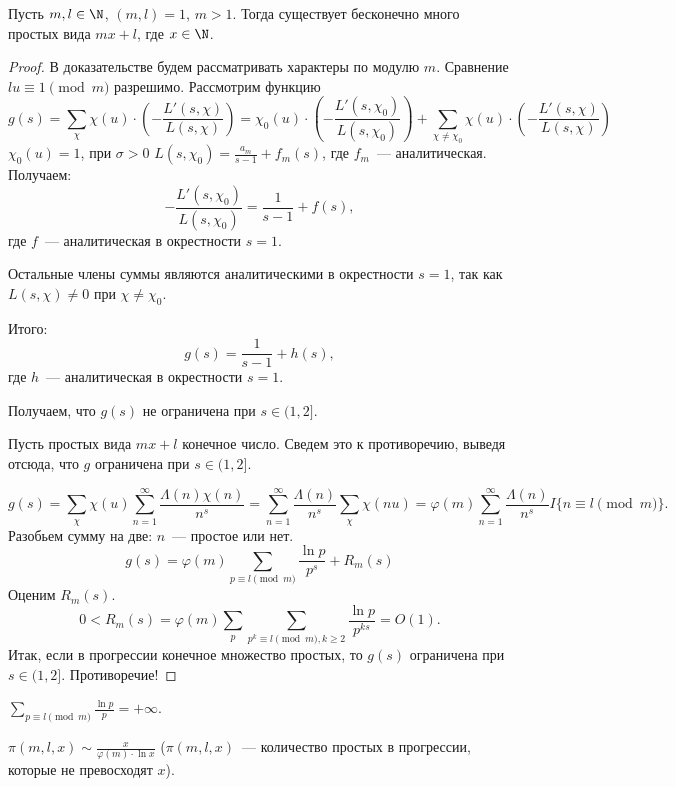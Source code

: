 \begin{theorem}[Дирихле]
  Пусть $m, l \in \N$, $(m, l) = 1$, $m > 1$. Тогда существует бесконечно много простых вида $mx + l$, где $x \in \N$.
\end{theorem}
\begin{proof}
  В доказательстве будем рассматривать характеры по модулю $m$.
  Сравнение $lu \equiv 1 \pmod m$ разрешимо. Рассмотрим функцию
  $$
    g(s) = \sum_{\chi} \chi(u) \cdot \left( -\frac{L'(s, \chi)}{L(s, \chi)}\right) = \chi_0(u) \cdot \left( -\frac{L'(s, \chi_0)}{L(s, \chi_0)}\right) + \sum_{\chi \ne \chi_0} \chi(u) \cdot \left( -\frac{L'(s, \chi)}{L(s, \chi)}\right)
  $$
  $\chi_0(u) = 1$, при $\sigma > 0$ $L(s, \chi_0) = \frac{a_m}{s - 1} + f_m(s)$, где $f_m$~— аналитическая. Получаем:
  $$
    -\frac{L'(s, \chi_0)}{L(s, \chi_0)} = \frac{1}{s - 1} + f(s),
  $$
  где $f$~— аналитическая в окрестности $s = 1$.
  
  Остальные члены суммы являются аналитическими в окрестности $s = 1$, так как $L(s, \chi) \ne 0$ при $\chi \ne \chi_0$.
  
  Итого:
  $$
    g(s) = \frac{1}{s - 1} + h(s),
  $$
  где $h$~— аналитическая в окрестности $s = 1$.
  
  Получаем, что $g(s)$ не ограничена при $s \in (1, 2]$.
  
  Пусть простых вида $mx + l$ конечное число. Сведем это к противоречию, выведя отсюда, что $g$ ограничена при $s \in (1, 2]$.
  
  $$
    g(s) = \sum_{\chi} \chi(u) \sum_{n = 1}^{\infty} \frac{\Lambda(n) \chi(n)}{n^s} = \sum_{n = 1}^{\infty}\frac{\Lambda(n)}{n^s} \sum_{\chi} \chi(nu) = \varphi(m) \sum_{n = 1}^{\infty}\frac{\Lambda(n)}{n^s} I\{n \equiv l \pmod m\}.
  $$
  Разобьем сумму на две: $n$~— простое или нет.
  $$
    g(s) = \varphi(m) \sum_{p \equiv l \pmod m} \frac{\ln p}{p^s} + R_m(s)
  $$
  Оценим $R_m(s)$.
  $$
    0 < R_m(s) = \varphi(m) \sum_p \sum_{p^k \equiv l \pmod m, k \geq 2} \frac{\ln p}{p^{ks}} = O(1).
  $$
  Итак, если в прогрессии конечное множество простых, то $g(s)$ ограничена при $s \in (1, 2]$. Противоречие!
\end{proof}

\begin{stm}
  $\sum_{p \equiv l \pmod m} \frac{\ln p}{p} = +\infty$.
\end{stm}

\begin{theorem}
  $\pi(m, l, x) \sim \frac{x}{\varphi(m) \cdot \ln x}$ ($\pi(m, l, x)$~— количество простых в прогрессии, которые не превосходят $x$).
\end{theorem}
